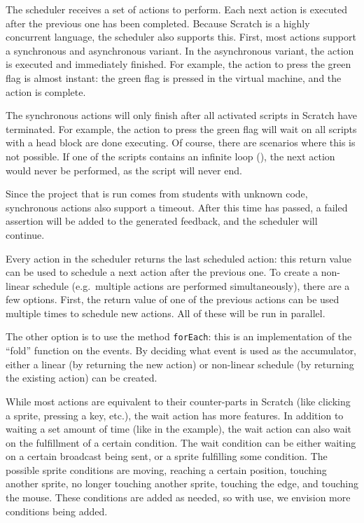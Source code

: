 \documentclass[../main]{subfiles}
\begin{document}
The scheduler receives a set of actions to perform.
Each next action is executed after the previous one has been completed.
Because Scratch is a highly concurrent language, the scheduler also supports this.
First, most actions support a synchronous and asynchronous variant.
In the asynchronous variant, the action is executed and immediately finished.
For example, the action to press the green flag is almost instant: the green flag is pressed in the virtual machine, and the action is complete.

The synchronous actions will only finish after all activated scripts in Scratch have terminated.
For example, the action to press the green flag will wait on all scripts with a head block  are done executing.
Of course, there are scenarios where this is not possible.
If one of the scripts contains an infinite loop (), the next action would never be performed, as the script will never end.

Since the project that is run comes from students with unknown code, synchronous actions also support a timeout.
After this time has passed, a failed assertion will be added to the generated feedback, and the scheduler will continue.

Every action in the scheduler returns the last scheduled action: this return value can be used to schedule a next action after the previous one.
To create a non-linear schedule (e.g.\ multiple actions are performed simultaneously), there are a few options.
First, the return value of one of the previous actions can be used multiple times to schedule new actions.
All of these will be run in parallel.


The other option is to use the method \texttt{forEach}: this is an implementation of the ``fold'' function on the events.
By deciding what event is used as the accumulator, either a linear (by returning the new action) or non-linear schedule (by returning the existing action) can be created.

While most actions are equivalent to their counter-parts in Scratch (like clicking a sprite, pressing a key, etc.), the wait action has more features.
In addition to waiting a set amount of time (like in the example), the wait action can also wait on the fulfillment of a certain condition.
The wait condition can be either waiting on a certain broadcast being sent, or a sprite fulfilling some condition.
The possible sprite conditions are moving, reaching a certain position, touching another sprite, no longer touching another sprite, touching the edge, and touching the mouse.
These conditions are added as needed, so with use, we envision more conditions being added.
\end{document}
